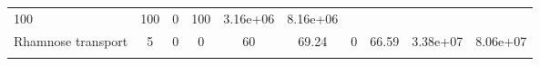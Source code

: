 \documentclass[]{article}
\begin{document}
\begin{longtable}[]{@{}lccccccccc@{}}
\begin{minipage}[t]{0.08\columnwidth}
100\strut
\end{minipage} & \begin{minipage}[t]{0.08\columnwidth}\centering\strut
100\strut
\end{minipage} & \begin{minipage}[t]{0.08\columnwidth}\centering\strut
0\strut
\end{minipage} & \begin{minipage}[t]{0.08\columnwidth}\centering\strut
100\strut
\end{minipage} & \begin{minipage}[t]{0.08\columnwidth}\centering\strut
3.16e+06\strut
\end{minipage} & \begin{minipage}[t]{0.08\columnwidth}\centering\strut
8.16e+06\strut
\end{minipage}\tabularnewline
\begin{minipage}[t]{0.07\columnwidth}\raggedright\strut
Rhamnose transport\strut
\end{minipage} & \begin{minipage}[t]{0.06\columnwidth}\centering\strut
5\strut
\end{minipage} & \begin{minipage}[t]{0.08\columnwidth}\centering\strut
0\strut
\end{minipage} & \begin{minipage}[t]{0.08\columnwidth}\centering\strut
0\strut
\end{minipage} & \begin{minipage}[t]{0.08\columnwidth}\centering\strut
60\strut
\end{minipage} & \begin{minipage}[t]{0.08\columnwidth}\centering\strut
69.24\strut
\end{minipage} & \begin{minipage}[t]{0.08\columnwidth}\centering\strut
0\strut
\end{minipage} & \begin{minipage}[t]{0.08\columnwidth}\centering\strut
66.59\strut
\end{minipage} & \begin{minipage}[t]{0.08\columnwidth}\centering\strut
3.38e+07\strut
\end{minipage} & \begin{minipage}[t]{0.08\columnwidth}\centering\strut
8.06e+07\strut
\end{minipage}\tabularnewline
\begin{minipage}[t]{0.07\columnwidth}\raggedright\strut

\end{minipage}
\end{longtable}
\end{document}
